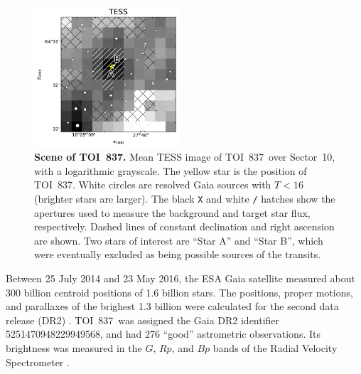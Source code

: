 \documentclass[12pt,twocolumn,tighten]{aastex63}
\newcommand{\tn}{TOI~837} %
\begin{document}
\begin{figure}[!t]
	\begin{center}
		\leavevmode
		\includegraphics[width=0.48\textwidth]{f5.pdf}
	\end{center}
	\vspace{-0.7cm}
	\caption{ {\bf Scene of \tn.}
    Mean TESS image of \tn\ over Sector~10, with a logarithmic
    grayscale. The yellow star is the position of \tn.  White circles
    are resolved Gaia sources with $T<16$ (brighter stars are larger).
    The black \texttt{X} and white \texttt{/} hatches show the
    apertures used to measure the background and target star flux,
    respectively. Dashed lines of constant declination and right
    ascension are shown.  Two stars of interest are ``Star A'' and
    ``Star B'', which were eventually excluded as being possible
    sources of the transits.
		\label{fig:scene}
	}
\end{figure}

Between 25 July 2014 and 23 May 2016, the ESA Gaia satellite measured
about 300 billion centroid positions of 1{.}6 billion stars.  The
positions, proper motions, and parallaxes of the brighest 1{.}3
billion were calculated for the second data release (DR2)
\citep{gaia_collaboration_gaia_2016,lindegren_gaiasoln_2018,gaia_collaboration_gaia_2018}.
\tn\ was assigned the Gaia DR2 identifier 5251470948229949568, and had
276 ``good'' astrometric observations. Its brightness was measured in
the $G$, $Rp$, and $Bp$ bands of the Radial Velocity Spectrometer
\citep{cropper_gaia_2018,evans_gaia_2018}.  
\end{document}
